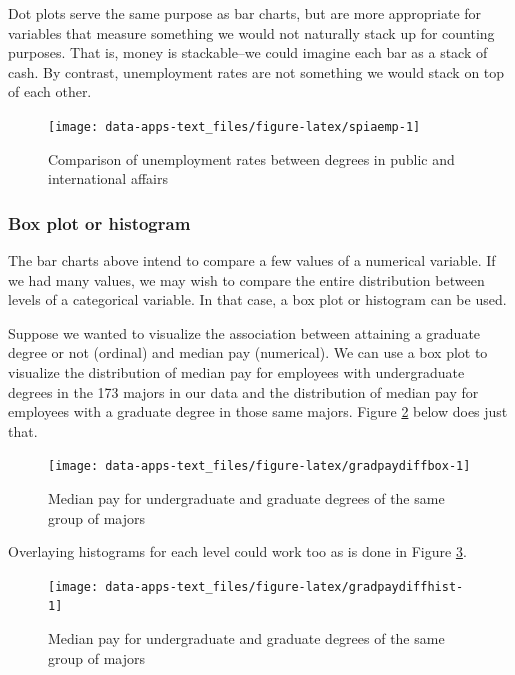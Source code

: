 \documentclass[
]{book}
\begin{document}
Dot plots serve the same purpose as bar charts, but are more appropriate for variables that measure something we would not naturally stack up for counting purposes. That is, money is stackable--we could imagine each bar as a stack of cash. By contrast, unemployment rates are not something we would stack on top of each other.

\begin{figure}

{\centering \texttt{[image: data-apps-text\_files/figure-latex/spiaemp-1]} 

}

\caption{Comparison of unemployment rates between degrees in public and international affairs}\label{fig:spiaemp}
\end{figure}

\hypertarget{box-plot-or-histogram}{%
\subsubsection{Box plot or histogram}\label{box-plot-or-histogram}}

The bar charts above intend to compare a few values of a numerical variable. If we had many values, we may wish to compare the entire distribution between levels of a categorical variable. In that case, a box plot or histogram can be used.

Suppose we wanted to visualize the association between attaining a graduate degree or not (ordinal) and median pay (numerical). We can use a box plot to visualize the distribution of median pay for employees with undergraduate degrees in the 173 majors in our data and the distribution of median pay for employees with a graduate degree in those same majors. Figure \ref{fig:gradpaydiffbox} below does just that.

\begin{figure}

{\centering \texttt{[image: data-apps-text\_files/figure-latex/gradpaydiffbox-1]} 

}

\caption{Median pay for undergraduate and graduate degrees of the same group of majors}\label{fig:gradpaydiffbox}
\end{figure}

Overlaying histograms for each level could work too as is done in Figure \ref{fig:gradpaydiffhist}.

\begin{figure}

{\centering \texttt{[image: data-apps-text\_files/figure-latex/gradpaydiffhist-1]} 

}

\caption{Median pay for undergraduate and graduate degrees of the same group of majors}\label{fig:gradpaydiffhist}
\end{figure}
\end{document}
